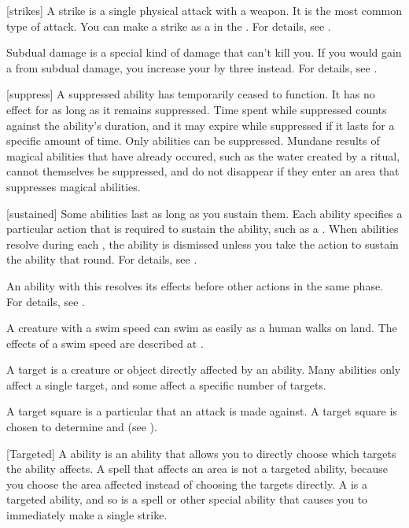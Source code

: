 [strikes] A strike is a single physical attack with a weapon.
It is the most common type of attack.
You can make a strike as a  in the .
For details, see .

 Subdual damage is a special kind of damage that can't kill you.
If you would gain a  from subdual damage, you increase your  by three instead.
For details, see .

[suppress] A suppressed ability has temporarily ceased to function.
It has no effect for as long as it remains suppressed.
Time spent while suppressed counts against the ability's duration, and it may expire while suppressed if it lasts for a specific amount of time.
Only \magical abilities can be suppressed.
Mundane results of magical abilities that have already occured, such as the water created by a  ritual, cannot themselves be suppressed, and do not disappear if they enter an area that suppresses magical abilities.

[sustained] Some abilities last as long as you sustain them.
Each ability specifies a particular action that is required to sustain the ability, such as a .
When  abilities resolve during each , the ability is dismissed unless you take the action to sustain the ability that round.
For details, see .

 An ability with this  resolves its effects before other actions in the same phase.
For details, see .

 A creature with a swim speed can swim as easily as a human walks on land.
The effects of a swim speed are described at .

 A target is a creature or object directly affected by an ability.
Many abilities only affect a single target, and some affect a specific number of targets.

 A target square is a particular  that an attack is made against.
A target square is chosen to determine  and  (see ).

[Targeted] A  ability is an ability that allows you to directly choose which targets the ability affects.
A spell that affects an area is not a targeted ability, because you choose the area affected instead of choosing the targets directly.
A  is a targeted ability, and so is a spell or other special ability that causes you to immediately make a single strike.

